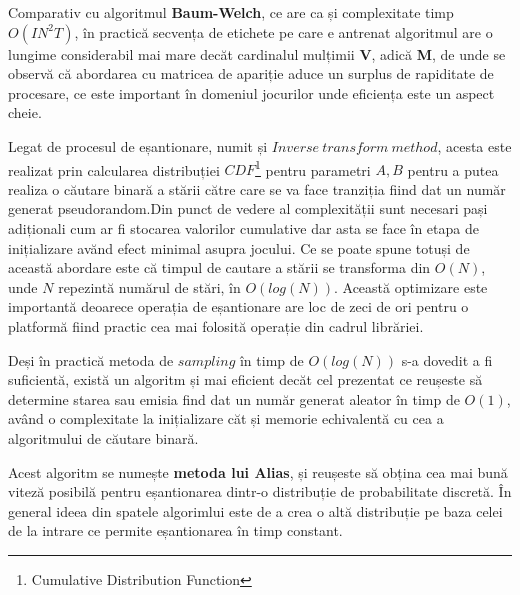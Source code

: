Comparativ cu algoritmul \textbf{Baum-Welch}, ce are ca și complexitate timp $O(IN^{2}T)$, în practică secvența de etichete pe care e antrenat algoritmul are o lungime considerabil mai mare decăt cardinalul mulțimii \textbf{V}, adică \textbf{M}, de unde se observă că abordarea cu matricea de apariție aduce un surplus de rapiditate de procesare, ce este important în domeniul jocurilor unde eficiența este un aspect cheie.\par

Legat de procesul de eșantionare, numit și $Inverse \ transform \ method$, acesta este realizat prin calcularea distribuției $CDF$\footnote{Cumulative Distribution Function} pentru parametri $A,B$ pentru a putea realiza o căutare binară a stării către care se va face tranziția fiind dat un număr generat pseudorandom.Din punct de vedere al complexității sunt necesari pași adiționali cum ar fi stocarea valorilor cumulative dar asta se face în etapa de inițializare avănd efect minimal asupra jocului. Ce se poate spune totuși de această abordare este că timpul de cautare a stării se transforma din $O(N)$, unde $N$ repezintă numărul de stări, în $O(log(N))$. Această optimizare este importantă deoarece operația de eșantionare are loc de zeci de ori pentru o platformă fiind practic cea mai folosită operație din cadrul librăriei.\par

Deși în practică metoda de $sampling$ în timp de $O(log(N))$ s-a dovedit a fi suficientă, există un algoritm și mai eficient decăt cel prezentat ce reușeste să determine starea sau emisia find dat un număr generat aleator în timp de $O(1)$, având o complexitate la inițializare căt și memorie echivalentă cu cea a algoritmului de căutare binară.\par

Acest algoritm se numește \textbf{metoda lui Alias}, și reușeste să obțina cea mai bună viteză posibilă pentru eșantionarea dintr-o distribuție de probabilitate discretă. În general ideea din spatele algorimlui este de a crea o altă distribuție pe baza celei de la intrare ce permite eșantionarea în timp constant.\par
